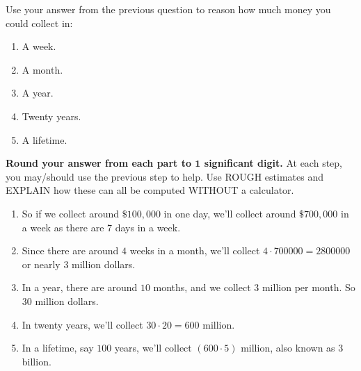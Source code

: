 \documentclass[nooutcomes,noauthor,hints]{ximera}
\begin{document}
\begin{question}
  Use your answer from the previous question to reason how much money
  you could collect in:
  \begin{enumerate}
  \item A week.
  \item A month.
  \item A year.
  \item Twenty years.
  \item A lifetime.
  \end{enumerate}
  \textbf{Round your answer from each part to $\boldsymbol{1}$ significant digit.}
  At each step, you may/should use the previous step to help. Use
  ROUGH estimates and EXPLAIN how these can all be computed WITHOUT a
  calculator.
  \begin{freeResponse}
    \begin{enumerate}
      \item So if we collect around $\$100,000$ in one day, we'll
        collect around $\$700,000$ in a week as there are $7$ days in
        a week.
      \item Since there are around $4$ weeks in a month, we'll collect
        $4\cdot 700000 = 2800000$ or nearly $3$ million dollars.
      \item In a year, there are around $10$ months, and we collect
        $3$ million per month. So $30$ million dollars.
      \item In twenty years, we'll collect $30\cdot 20 = 600$ million.
      \item In a lifetime, say $100$ years, we'll collect $(600\cdot 5)$
        million, also known as $3$ billion.
    \end{enumerate}
  \end{freeResponse}
\end{question}
\mynewpage
\end{document}
